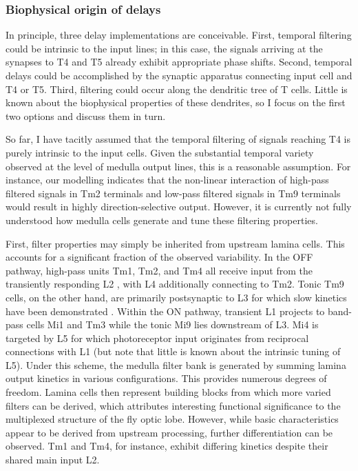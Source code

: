 \subsubsection{Biophysical origin of delays}
In principle, three delay implementations are conceivable. First, temporal filtering could be intrinsic to the input lines; in this case, the signals arriving at the synapses to T4 and T5 already exhibit appropriate phase shifts. Second, temporal delays could be accomplished by the synaptic apparatus connecting input cell and T4 or T5. Third, filtering could occur along the dendritic tree of T cells. Little is known about the biophysical properties of these dendrites, so I focus on the first two options and discuss them in turn.

So far, I have tacitly assumed that the temporal filtering of signals reaching T4 is purely intrinsic to the input cells. Given the substantial temporal variety observed at the level of medulla output lines, this is a reasonable assumption. For instance, our modelling indicates that the non-linear interaction of high-pass filtered signals in Tm2 terminals and low-pass filtered signals in Tm9 terminals would result in highly direction-selective output. However, it is currently not fully understood how medulla cells generate and tune these filtering properties.

First, filter properties may simply be inherited from upstream lamina cells. This accounts for a significant fraction of the observed variability. In the OFF pathway, high-pass units Tm1, Tm2, and Tm4 all receive input from the transiently responding L2 \citep{Fischbach:1989uw,RiveraAlba:2011dd,Takemura:2017aa}, with L4 additionally connecting to Tm2. Tonic Tm9 cells, on the other hand, are primarily postsynaptic to L3 for which slow kinetics have been demonstrated \citep{Silies:2013jp}. Within the ON pathway, transient L1 projects to band-pass cells Mi1 and Tm3 while the tonic Mi9 lies downstream of L3. Mi4 is targeted by L5 for which photoreceptor input originates from reciprocal connections with L1 (but note that little is known about the intrinsic tuning of L5). Under this scheme, the medulla filter bank is generated by summing lamina output kinetics in various configurations. This provides numerous degrees of freedom. Lamina cells then represent building blocks from which more varied filters can be derived, which attributes interesting functional significance to the multiplexed structure of the fly optic lobe. However, while basic characteristics appear to be derived from upstream processing, further differentiation can be observed. Tm1 and Tm4, for instance, exhibit differing kinetics despite their shared main input L2.

